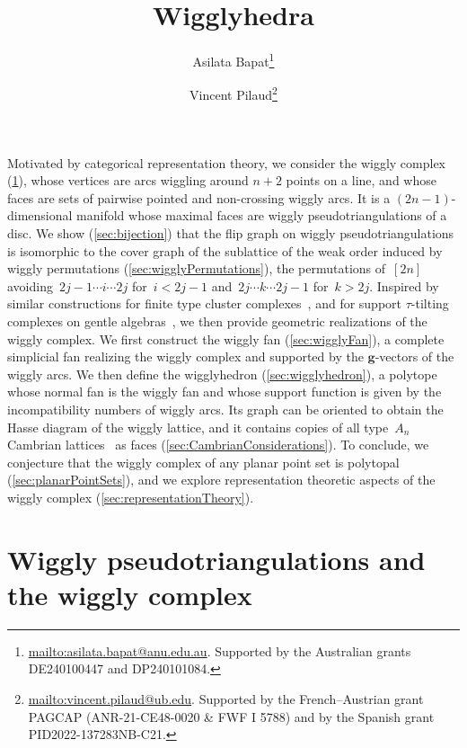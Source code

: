 \documentclass[submission]{FPSAC2025}
\title{Wigglyhedra}
\author{Asilata Bapat\thanks{\href{mailto:asilata.bapat@anu.edu.au}{mailto:asilata.bapat@anu.edu.au}. Supported by the Australian grants DE240100447 and DP240101084.}\addressmark{1} \and Vincent Pilaud\thanks{\href{mailto:vincent.pilaud@ub.edu}{mailto:vincent.pilaud@ub.edu}. Supported by the French--Austrian grant PAGCAP (ANR-21-CE48-0020 \& FWF I 5788) and by the Spanish grant PID2022-137283NB-C21.}\addressmark{2}}
\theoremstyle{definition}
\renewcommand{\b}[1]{{\boldsymbol{#1}}} %
\begin{document}

\maketitle

Motivated by categorical representation theory, we consider the wiggly complex (\cref{sec:wigglyPseudotriangulations}), whose vertices are arcs wiggling around $n+2$ points on a line, and whose faces are sets of pairwise pointed and non-crossing wiggly arcs.
It is a $(2n-1)$-dimensional manifold whose maximal faces are wiggly pseudotriangulations of a disc.
We show (\cref{sec:bijection}) that the flip graph on wiggly pseudotriangulations is isomorphic to the cover graph of the sublattice of the weak order induced by wiggly permutations (\cref{sec:wigglyPermutations}), the permutations of~$[2n]$ avoiding~$2j-1 \cdots i \cdots 2j$ for~$i < 2j-1$ and~$2j \cdots k \cdots 2j-1$ for~$k > 2j$.
Inspired by similar constructions for finite type cluster complexes~\cite{HohlwegLangeThomas,HohlwegPilaudStella}, and for support $\tau$-tilting complexes on gentle algebras~\cite{PaluPilaudPlamondon-nonkissing}, we then provide geometric realizations of the wiggly complex.
We first construct the wiggly fan (\cref{sec:wigglyFan}), a complete simplicial fan realizing the wiggly complex and supported by the $\b{g}$-vectors of the wiggly arcs.
We then define the wigglyhedron (\cref{sec:wigglyhedron}), a polytope whose normal fan is the wiggly fan and whose support function is given by the incompatibility numbers of wiggly arcs.
Its graph can be oriented to obtain the Hasse diagram of the wiggly lattice, and it contains copies of all type~$A_n$ Cambrian lattices~\cite{Reading-CambrianLattices} as faces (\cref{sec:CambrianConsiderations}).
To conclude, we conjecture that the wiggly complex of any planar point set is polytopal (\cref{sec:planarPointSets}), and we explore representation theoretic aspects of the wiggly complex (\cref{sec:representationTheory}).

\newpage
\section{Wiggly pseudotriangulations and the wiggly complex}
\label{sec:wigglyPseudotriangulations}
\end{document}
